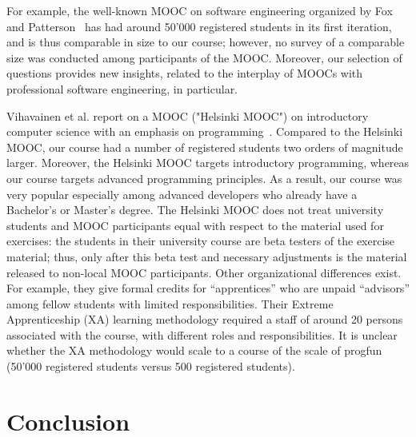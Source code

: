 \documentclass{sig-alternate}
\begin{document}
For example, the well-known MOOC on software engineering organized by Fox and
Patterson~\cite{FoxP12} has had around 50'000 registered students in its first
iteration, and is thus comparable in size to our course; however, no survey of
a comparable size was conducted among participants of the MOOC. Moreover, our
selection of questions provides new insights, related to the interplay of
MOOCs with professional software engineering, in particular.


Vihavainen et al. report on a MOOC ("Helsinki MOOC") on introductory computer
science with an emphasis on programming~\cite{VihavainenLK12}. Compared to the
Helsinki MOOC, our course had a number of registered students two orders of
magnitude larger. Moreover, the Helsinki MOOC targets introductory
programming, whereas our course targets advanced programming principles. As a
result, our course was very popular especially among advanced developers who
already have a Bachelor's or Master's degree. The Helsinki MOOC does not treat
university students and MOOC participants equal with respect to the material
used for exercises: the students in their university course are beta testers
of the exercise material; thus, only after this beta test and necessary
adjustments is the material released to non-local MOOC participants. Other
organizational differences exist. For example, they give formal credits for
``apprentices'' who are unpaid ``advisors'' among fellow students with limited
responsibilities. Their Extreme Apprenticeship (XA) learning methodology
required a staff of around 20 persons associated with the course, with
different roles and responsibilities. It is unclear whether the XA methodology
would scale to a course of the scale of progfun (50'000 registered students
versus 500 registered students).


\section{Conclusion}
\label{sec:conclusion}


%

%
%
\end{document}
